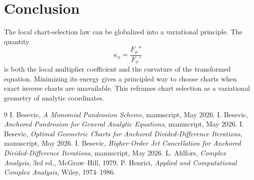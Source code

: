 \documentclass[11pt]{article}
\theoremstyle{definition}
\begin{document}
\section{Conclusion}

The local chart-selection law can be globalized into a variational principle. The quantity
\[
\kappa_\phi=\frac{F_\phi''}{F_\phi'}
\]
is both the local multiplier coefficient and the curvature of the transformed equation. Minimizing its energy gives a principled way to choose charts when exact inverse charts are unavailable. This reframes chart selection as a variational geometry of analytic coordinates.

\begin{thebibliography}{9}
I. Besevic, \emph{A Monomial Pandrosion Scheme}, manuscript, May 2026.
I. Besevic, \emph{Anchored Pandrosion for General Analytic Equations}, manuscript, May 2026.
I. Besevic, \emph{Optimal Geometric Charts for Anchored Divided-Difference Iterations}, manuscript, May 2026.
I. Besevic, \emph{Higher-Order Jet Cancellation for Anchored Divided-Difference Iterations}, manuscript, May 2026.
L. Ahlfors, \emph{Complex Analysis}, 3rd ed., McGraw--Hill, 1979.
P. Henrici, \emph{Applied and Computational Complex Analysis}, Wiley, 1974--1986.
\end{thebibliography}
\end{document}
